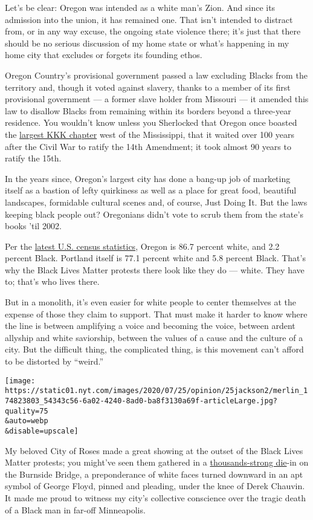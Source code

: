 Let's be clear: Oregon was intended as a white man's Zion. And since its
admission into the union, it has remained one. That isn't intended to
distract from, or in any way excuse, the ongoing state violence there;
it's just that there should be no serious discussion of my home state or
what's happening in my home city that excludes or forgets its founding
ethos.

Oregon Country's provisional government passed a law excluding Blacks
from the territory and, though it voted against slavery, thanks to a
member of its first provisional government --- a former slave holder
from Missouri --- it amended this law to disallow Blacks from remaining
within its borders beyond a three-year residence. You wouldn't know
unless you Sherlocked that Oregon once boasted the
\href{https://www.wweek.com/arts/2017/08/17/oregon-was-once-ku-ku-for-the-klan/}{largest
KKK chapter} west of the Mississippi, that it waited over 100 years
after the Civil War to ratify the 14th Amendment; it took almost 90
years to ratify the 15th.

In the years since, Oregon's largest city has done a bang-up job of
marketing itself as a bastion of lefty quirkiness as well as a place for
great food, beautiful landscapes, formidable cultural scenes and, of
course, Just Doing It. But the laws keeping black people out? Oregonians
didn't vote to scrub them from the state's books 'til 2002.

Per the
\href{https://www.census.gov/quickfacts/fact/table/portlandcityoregon,OR/PST045219}{latest
U.S. census statistics}, Oregon is 86.7 percent white, and 2.2 percent
Black. Portland itself is 77.1 percent white and 5.8 percent Black.
That's why the Black Lives Matter protests there look like they do ---
white. They have to; that's who lives there.

But in a monolith, it's even easier for white people to center
themselves at the expense of those they claim to support. That must make
it harder to know where the line is between amplifying a voice and
becoming the voice, between ardent allyship and white saviorship,
between the values of a cause and the culture of a city. But the
difficult thing, the complicated thing, is this movement can't afford to
be distorted by ``weird.''

\texttt{[image: https://static01.nyt.com/images/2020/07/25/opinion/25jackson2/merlin\_174823803\_54343c56-6a02-4240-8ad0-ba8f3130a69f-articleLarge.jpg?quality=75\\\&auto=webp\\\&disable=upscale]}

My beloved City of Roses made a great showing at the outset of the Black
Lives Matter protests; you might've seen them gathered in a
\href{https://www.oregonlive.com/news/2020/06/the-world-needs-to-see-this-the-story-behind-the-iconic-photo-of-the-burnside-bridge-protest-in-portland.html}{thousands-strong
die}-in on the Burnside Bridge, a preponderance of white faces turned
downward in an apt symbol of George Floyd, pinned and pleading, under
the knee of Derek Chauvin. It made me proud to witness my city's
collective conscience over the tragic death of a Black man in far-off
Minneapolis.

